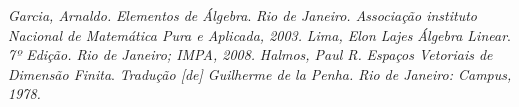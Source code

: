 
\begin{thebibliography}{99}


        \textit{Garcia, Arnaldo.} {\it Elementos de Álgebra}. \textit{Rio de Janeiro. Associação instituto Nacional de Matemática Pura e Aplicada, 2003.}
        \textit{Lima, Elon Lajes} {\it Álgebra Linear}. \textit{7º Edição. Rio de Janeiro; IMPA, 2008.}
        \textit{Halmos, Paul R.} {\it Espaços Vetoriais de Dimensão Finita}. \textit{Tradução [de] Guilherme de la Penha. Rio de Janeiro: Campus, 1978.}


       \end{thebibliography}
